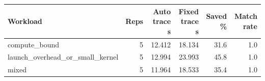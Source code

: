 \begin{tabular}{lrrrrr}
\hline
Workload & Reps & Auto trace s & Fixed trace s & Saved \% & Match rate \\
\hline
compute_bound & 5 & 12.412 & 18.134 & 31.6 & 1.0 \\
launch_overhead_or_small_kernel & 5 & 12.994 & 23.993 & 45.8 & 1.0 \\
mixed & 5 & 11.964 & 18.533 & 35.4 & 1.0 \\
\hline
\end{tabular}
